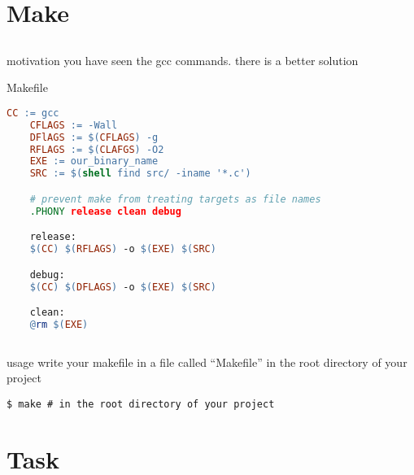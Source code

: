 \documentclass[10pt,graphics,aspectratio=169,table]{beamer}
\begin{document}
\section{Make}
\subsection{}

\begin{frame}{motivation}
  you have seen the gcc commands.
  \bigskip
  there is a better solution
\end{frame}

\begin{frame}[fragile]{Makefile}
    \begin{lstlisting}[language=make]
    CC := gcc
    CFLAGS := -Wall
    DFlAGS := $(CFLAGS) -g
    RFLAGS := $(CLAFGS) -O2
    EXE := our_binary_name
    SRC := $(shell find src/ -iname '*.c')

    # prevent make from treating targets as file names
    .PHONY release clean debug 

    release: 
    $(CC) $(RFLAGS) -o $(EXE) $(SRC)

    debug:
    $(CC) $(DFLAGS) -o $(EXE) $(SRC)

    clean:
    @rm $(EXE)
    
  \end{lstlisting}
\end{frame}

\begin{frame}[fragile]{usage}
  write your makefile in a file called \enquote{Makefile} in the root directory
  of your project
  
    \begin{lstlisting}[numbers=none]
    $ make # in the root directory of your project
  \end{lstlisting}
  
\end{frame}
\section{Task}
\end{document}
